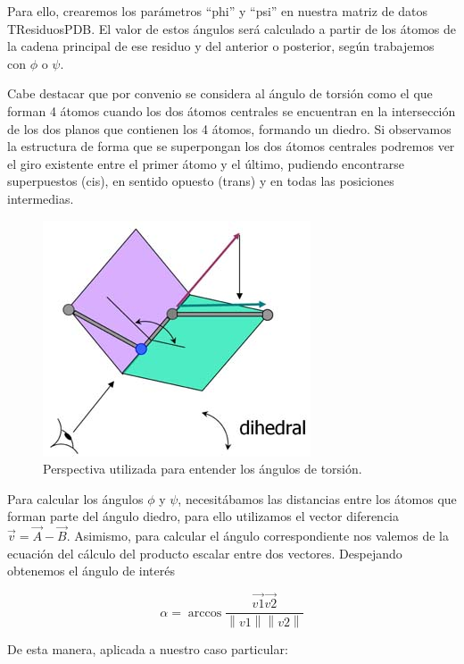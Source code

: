 \documentclass[12pt]{article}
\begin{document}
Para ello, crearemos los parámetros ``phi'' y ``psi'' en nuestra matriz de datos TResiduosPDB. El valor de estos ángulos será calculado a partir de los átomos de la cadena principal de ese residuo y del anterior o posterior, según trabajemos con $\phi$ o $\psi$.
\newline

Cabe destacar que por convenio se considera al ángulo de torsión como el que forman 4 átomos cuando los dos átomos centrales se encuentran en la intersección de los dos planos que contienen los 4 átomos, formando un diedro. Si observamos la estructura de forma que se superpongan los dos átomos centrales podremos ver el giro existente entre el primer átomo y el último, pudiendo encontrarse superpuestos (cis), en sentido opuesto (trans) y en todas las posiciones intermedias.

\begin{figure}[H]
\centering
\includegraphics[scale=3]{diedro}
\caption{Perspectiva utilizada para entender los ángulos de torsión.}
\end{figure}

Para calcular los ángulos $\phi$ y $\psi$, necesitábamos las distancias entre los átomos que forman parte del ángulo diedro, para ello utilizamos el vector diferencia $\overrightarrow{v}= \overrightarrow{A}- \overrightarrow{B}$. Asimismo, para calcular el ángulo correspondiente nos valemos de la ecuación del cálculo del producto escalar entre dos vectores. Despejando obtenemos el ángulo de interés

\begin{equation}
\alpha=\arccos\frac{\overrightarrow{v1}\overrightarrow{v2}}{\left\| v1 \right\| \left\| v2 \right\|} 
\end{equation}

De esta manera, aplicada a nuestro caso particular:
\end{document}
